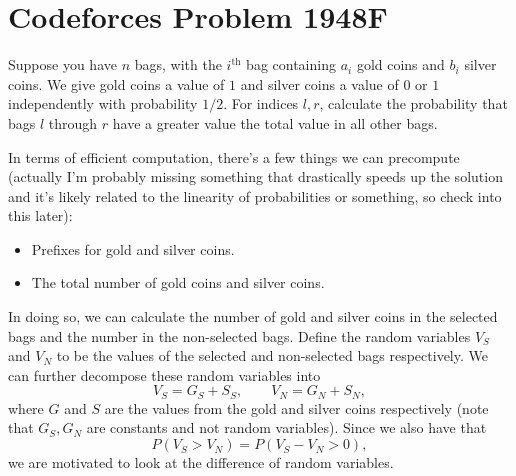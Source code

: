 \documentclass[a4paper, 12pt]{article}
\begin{document}
\section*{Codeforces Problem 1948F}

\begin{chirpbox}
    \begin{problem}
        Suppose you have \( n \) bags, with the \( i^{\text{th}} \) bag containing \( a_i \) gold coins and \( b_i \) silver coins. We give gold coins a value of \( 1 \) and silver coins a value of \( 0 \) or \( 1 \) independently with probability \( 1/2 \). For indices \( l, r \), calculate the probability that bags \( l \) through \( r \) have a greater value the total value in all other bags.
    \end{problem}
\end{chirpbox}

\begin{solution}
    In terms of efficient computation, there's a few things we can precompute (actually I'm probably missing something that drastically speeds up the solution and it's likely related to the linearity of probabilities or something, so check into this later):
    \begin{itemize}
        \item Prefixes for gold and silver coins.
        \item The total number of gold coins and silver coins.
    \end{itemize}
    In doing so, we can calculate the number of gold and silver coins in the selected bags and the number in the non-selected bags. Define the random variables \( V_S \) and \( V_N \) to be the values of the selected and non-selected bags respectively. We can further decompose these random variables into
    \[
        V_S = G_S + S_S, \qquad V_N = G_N + S_N
    ,\]
    where \( G \) and \( S \) are the values from the gold and silver coins respectively (note that \( G_S, G_N \) are constants and not random variables). Since we also have that
    \[
        P(V_S > V_N) = P(V_S - V_N > 0)
    ,\]
    we are motivated to look at the difference of random variables.
\end{solution}
\end{document}
